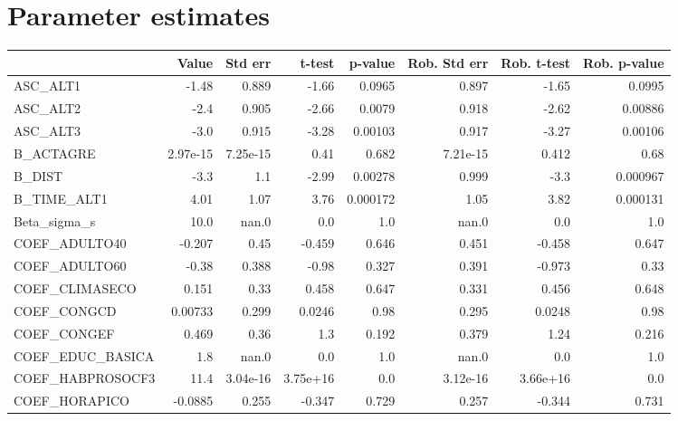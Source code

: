 \section{Parameter estimates}
\begin{tabular}{lrrrrrrr}
\toprule
{} &    Value &  Std err &    t-test &  p-value &  Rob. Std err &  Rob. t-test &  Rob. p-value \\
\midrule
ASC\_ALT1         &    -1.48 &    0.889 &     -1.66 &   0.0965 &         0.897 &        -1.65 &        0.0995 \\
ASC\_ALT2         &     -2.4 &    0.905 &     -2.66 &   0.0079 &         0.918 &        -2.62 &       0.00886 \\
ASC\_ALT3         &     -3.0 &    0.915 &     -3.28 &  0.00103 &         0.917 &        -3.27 &       0.00106 \\
B\_ACTAGRE        & 2.97e-15 & 7.25e-15 &      0.41 &    0.682 &      7.21e-15 &        0.412 &          0.68 \\
B\_DIST           &     -3.3 &      1.1 &     -2.99 &  0.00278 &         0.999 &         -3.3 &      0.000967 \\
B\_TIME\_ALT1      &     4.01 &     1.07 &      3.76 & 0.000172 &          1.05 &         3.82 &      0.000131 \\
Beta\_sigma\_s     &     10.0 &    nan.0 &       0.0 &      1.0 &         nan.0 &          0.0 &           1.0 \\
COEF\_ADULTO40    &   -0.207 &     0.45 &    -0.459 &    0.646 &         0.451 &       -0.458 &         0.647 \\
COEF\_ADULTO60    &    -0.38 &    0.388 &     -0.98 &    0.327 &         0.391 &       -0.973 &          0.33 \\
COEF\_CLIMASECO   &    0.151 &     0.33 &     0.458 &    0.647 &         0.331 &        0.456 &         0.648 \\
COEF\_CONGCD      &  0.00733 &    0.299 &    0.0246 &     0.98 &         0.295 &       0.0248 &          0.98 \\
COEF\_CONGEF      &    0.469 &     0.36 &       1.3 &    0.192 &         0.379 &         1.24 &         0.216 \\
COEF\_EDUC\_BASICA &      1.8 &    nan.0 &       0.0 &      1.0 &         nan.0 &          0.0 &           1.0 \\
COEF\_HABPROSOCF3 &     11.4 & 3.04e-16 &  3.75e+16 &      0.0 &      3.12e-16 &     3.66e+16 &           0.0 \\
COEF\_HORAPICO    &  -0.0885 &    0.255 &    -0.347 &    0.729 &         0.257 &       -0.344 &         0.731 \\

\end{tabular}
